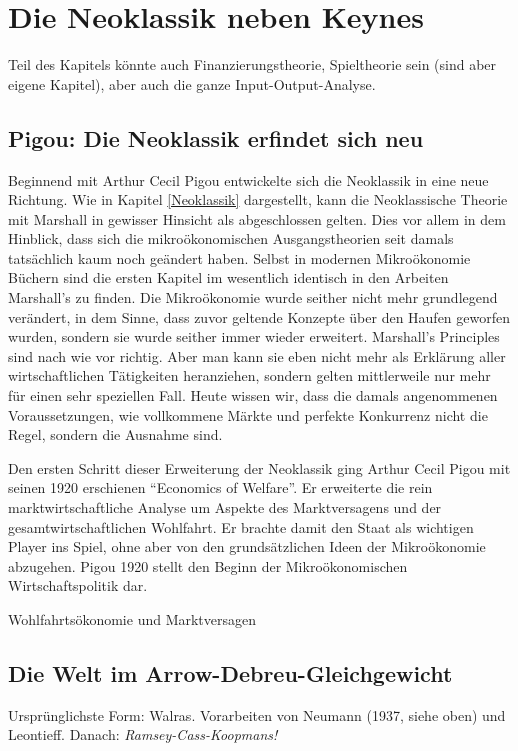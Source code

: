 %
%
%

\chapter{Die Neoklassik neben Keynes}
\label{Neoklassik_nach1945}

Teil des Kapitels könnte auch Finanzierungstheorie, Spieltheorie sein (sind aber eigene Kapitel), aber auch die ganze Input-Output-Analyse.


\section{Pigou: Die Neoklassik erfindet sich neu}
\label{sec: Pigou}
Beginnend mit Arthur Cecil Pigou entwickelte sich die Neoklassik in eine neue Richtung. Wie in Kapitel \ref{Neoklassik} dargestellt, kann die Neoklassische Theorie mit Marshall in gewisser Hinsicht als abgeschlossen gelten. Dies vor allem in dem Hinblick, dass sich die mikroökonomischen Ausgangstheorien seit damals tatsächlich kaum noch geändert haben. Selbst in modernen Mikroökonomie Büchern sind die ersten Kapitel im wesentlich identisch in den Arbeiten Marshall's zu finden. Die Mikroökonomie wurde seither nicht mehr grundlegend verändert, in dem Sinne, dass zuvor geltende Konzepte über den Haufen geworfen wurden, sondern sie wurde seither immer wieder erweitert. Marshall's Principles sind nach wie vor richtig. Aber man kann sie eben nicht mehr als Erklärung aller wirtschaftlichen Tätigkeiten heranziehen, sondern gelten mittlerweile nur mehr für einen sehr speziellen Fall. Heute wissen wir, dass die damals angenommenen Voraussetzungen, wie vollkommene Märkte und perfekte Konkurrenz nicht die Regel, sondern die Ausnahme sind.

Den ersten Schritt dieser Erweiterung der Neoklassik ging Arthur Cecil Pigou mit seinen 1920 erschienen "`Economics of Welfare"'. Er erweiterte die rein marktwirtschaftliche Analyse um Aspekte des Marktversagens und der gesamtwirtschaftlichen Wohlfahrt. Er brachte damit den Staat als wichtigen Player ins Spiel, ohne aber von den grundsätzlichen Ideen der Mikroökonomie abzugehen. Pigou 1920 stellt den Beginn der Mikroökonomischen Wirtschaftspolitik dar.

Wohlfahrtsökonomie und Marktversagen


\section{Die Welt im Arrow-Debreu-Gleichgewicht}
\label{Arrow-Debreu}
Ursprünglichste Form: Walras.
Vorarbeiten von Neumann (1937, siehe oben) und Leontieff. Danach: \textit{Ramsey-Cass-Koopmans!}

